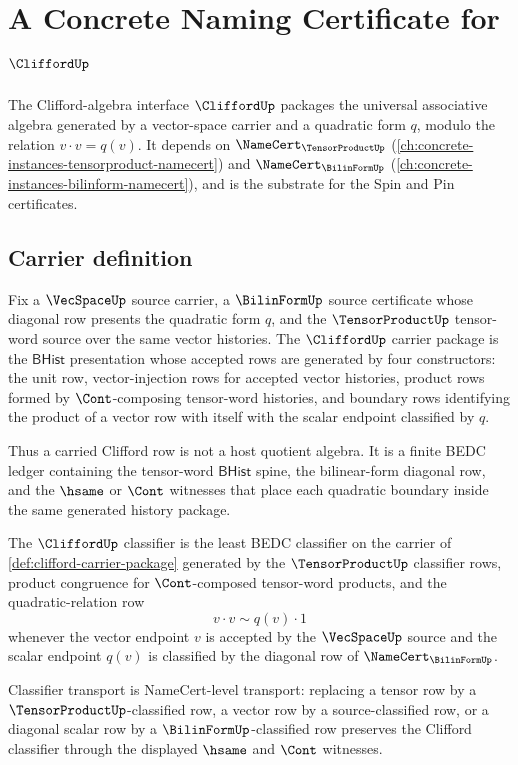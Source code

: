 \chapter{A Concrete Naming Certificate for $\CliffordUp$}
\label{ch:concrete-instances-clifford-namecert}

The Clifford-algebra interface $\CliffordUp$ packages the universal associative algebra generated by a vector-space carrier and a quadratic form $q$, modulo the relation $v \cdot v = q(v)$. It depends on $\NameCert_{\TensorProductUp}$ (\autoref{ch:concrete-instances-tensorproduct-namecert}) and $\NameCert_{\BilinFormUp}$ (\autoref{ch:concrete-instances-bilinform-namecert}), and is the substrate for the Spin and Pin certificates.

\section{Carrier definition}
\label{sec:clifford-carrier}

\begin{definition}
\label{def:clifford-carrier-package}
Fix a $\VecSpaceUp$ source carrier, a $\BilinFormUp$ source certificate whose diagonal row presents the quadratic form $q$, and the $\TensorProductUp$ tensor-word source over the same vector histories. The $\CliffordUp$ carrier package is the $\mathsf{BHist}$ presentation whose accepted rows are generated by four constructors: the unit row, vector-injection rows for accepted vector histories, product rows formed by $\Cont$-composing tensor-word histories, and boundary rows identifying the product of a vector row with itself with the scalar endpoint classified by $q$.

Thus a carried Clifford row is not a host quotient algebra. It is a finite BEDC ledger containing the tensor-word $\mathsf{BHist}$ spine, the bilinear-form diagonal row, and the $\hsame$ or $\Cont$ witnesses that place each quadratic boundary inside the same generated history package.
\end{definition}

\begin{definition}
\label{def:clifford-classifier-package}
The $\CliffordUp$ classifier is the least BEDC classifier on the carrier of \autoref{def:clifford-carrier-package} generated by the $\TensorProductUp$ classifier rows, product congruence for $\Cont$-composed tensor-word products, and the quadratic-relation row
$$
v \cdot v \sim q(v) \cdot 1
$$
whenever the vector endpoint $v$ is accepted by the $\VecSpaceUp$ source and the scalar endpoint $q(v)$ is classified by the diagonal row of $\NameCert_{\BilinFormUp}$.

Classifier transport is NameCert-level transport: replacing a tensor row by a $\TensorProductUp$-classified row, a vector row by a source-classified row, or a diagonal scalar row by a $\BilinFormUp$-classified row preserves the Clifford classifier through the displayed $\hsame$ and $\Cont$ witnesses.
\end{definition}

